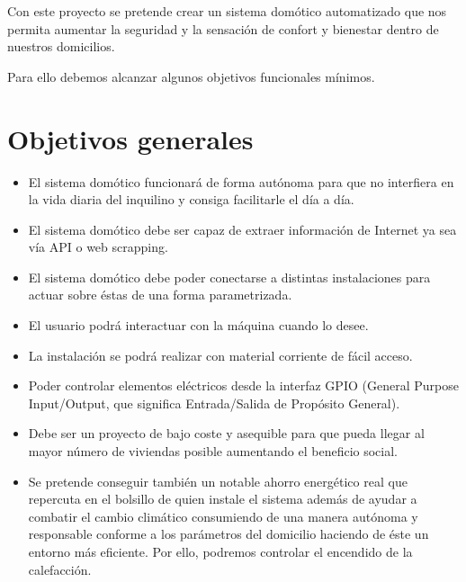
Con este proyecto se pretende crear un sistema domótico automatizado que nos permita aumentar la seguridad y la sensación de confort y bienestar dentro de nuestros domicilios.

Para ello debemos alcanzar algunos objetivos funcionales mínimos.

\section{Objetivos generales}

\begin{itemize}
    \item El sistema domótico funcionará de forma autónoma para que no interfiera en la vida diaria del inquilino y consiga facilitarle el día a día.
    \item El sistema domótico debe ser capaz de extraer información de Internet ya sea vía API o web scrapping.
    \item El sistema domótico debe poder conectarse a distintas instalaciones para actuar sobre éstas de una forma parametrizada.
    \item El usuario podrá interactuar con la máquina cuando lo desee.
    \item La instalación se podrá realizar con material corriente de fácil acceso.
    \item Poder controlar elementos eléctricos desde la interfaz GPIO (General Purpose Input/Output, que significa Entrada/Salida de Propósito General).
    \item Debe ser un proyecto de bajo coste y asequible para que pueda llegar al mayor número de viviendas posible aumentando el beneficio social.
    \item Se pretende conseguir también un notable ahorro energético real que repercuta en el bolsillo de quien instale el sistema además de ayudar a combatir el cambio climático consumiendo de una manera autónoma y responsable conforme a los parámetros del domicilio haciendo de éste un entorno más eficiente. Por ello, podremos controlar el encendido de la calefacción.
\end{itemize}

